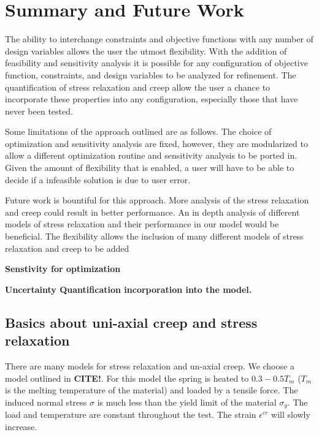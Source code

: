 \documentclass[10pt]{article}
\begin{document}
\newpage





\section{Summary and Future Work}
\label{sec:summary}
The ability to interchange constraints and objective functions with any number of design variables allows the user the utmost flexibility. With the addition of feasibility and sensitivity analysis it is possible for any configuration of objective function, constraints, and design variables to be analyzed for refinement. The quantification of stress relaxation and creep allow the user a chance to incorporate these properties into any configuration, especially those that have never been tested. 

Some limitations of the approach outlined are as follows. The choice of optimization and sensitivity analysis are fixed, however, they are modularized to allow a different optimization routine and sensitivity analysis to be ported in. Given the amount of flexibility that is enabled, a user will have to be able to decide if a infeasible solution is due to user error. 

Future work is bountiful for this approach. More analysis of the stress relaxation and creep could result in better performance. An in depth analysis of different models of stress relaxation and their performance in our model would be beneficial. The flexibility allows the inclusion of many different models of stress relaxation and creep to be added

\textbf{Senstivity for optimization}


\textbf{Uncertainty Quantification incorporation into the model.}



\subsection{Basics about uni-axial creep and stress relaxation}
\label{sec:stress}
There are many models for stress relaxation and un-axial creep. We choose a model outlined in \textbf{CITE!}. For this model the spring is heated to $0.3-0.5T_m$ ($T_m$ is the melting temperature of the material) and loaded by a tensile force. The induced normal stress $\sigma$ is much less than the yield limit of the material $\sigma_y$. The load and temperature are constant throughout the test. The strain $\epsilon^{cr}$ will slowly increase.
\end{document}
